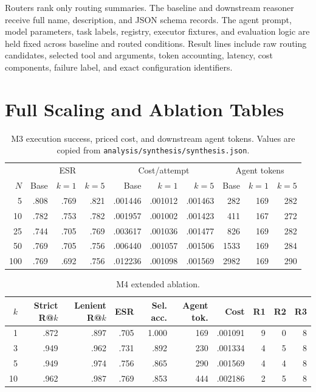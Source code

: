 \documentclass[10pt,twocolumn]{article}
\begin{document}
Routers rank only routing summaries. The baseline and downstream reasoner receive full name, description, and JSON schema records. The agent prompt, model parameters, task labels, registry, executor fixtures, and evaluation logic are held fixed across baseline and routed conditions. Result lines include raw routing candidates, selected tool and arguments, token accounting, latency, cost components, failure label, and exact configuration identifiers.

\section{Full Scaling and Ablation Tables}

\begin{table}[h]
\centering
\caption{M3 execution success, priced cost, and downstream agent tokens. Values are copied from \texttt{analysis/synthesis/synthesis.json}.}
\small
\begin{tabular}{rrrrrrrrrr}
\toprule
& \multicolumn{3}{c}{ESR} & \multicolumn{3}{c}{Cost/attempt} & \multicolumn{3}{c}{Agent tokens} \\
\cmidrule(lr){2-4}\cmidrule(lr){5-7}\cmidrule(lr){8-10}
$N$ & Base & $k=1$ & $k=5$ & Base & $k=1$ & $k=5$ & Base & $k=1$ & $k=5$ \\
\midrule
5   & .808 & .769 & .821 & .001446 & .001012 & .001463 & 282 & 169 & 282 \\
10  & .782 & .753 & .782 & .001957 & .001002 & .001423 & 411 & 167 & 272 \\
25  & .744 & .705 & .769 & .003617 & .001036 & .001477 & 826 & 169 & 282 \\
50  & .769 & .705 & .756 & .006440 & .001057 & .001506 & 1533 & 169 & 284 \\
100 & .769 & .692 & .756 & .012236 & .001098 & .001569 & 2982 & 169 & 290 \\
\bottomrule
\end{tabular}
\end{table}

\begin{table}[h]
\centering
\caption{M4 extended ablation.}
\small
\begin{tabular}{rrrrrrrrrr}
\toprule
$k$ & Strict R@$k$ & Lenient R@$k$ & ESR & Sel. acc. & Agent tok. & Cost & R1 & R2 & R3 \\
\midrule
1  & .872 & .897 & .705 & 1.000 & 169 & .001091 & 9 & 0 & 8 \\
3  & .949 & .962 & .731 & .892 & 230 & .001334 & 4 & 5 & 8 \\
5  & .949 & .974 & .756 & .865 & 290 & .001569 & 4 & 4 & 8 \\
10 & .962 & .987 & .769 & .853 & 444 & .002186 & 2 & 5 & 8 \\
\bottomrule
\end{tabular}
\end{table}
\end{document}
